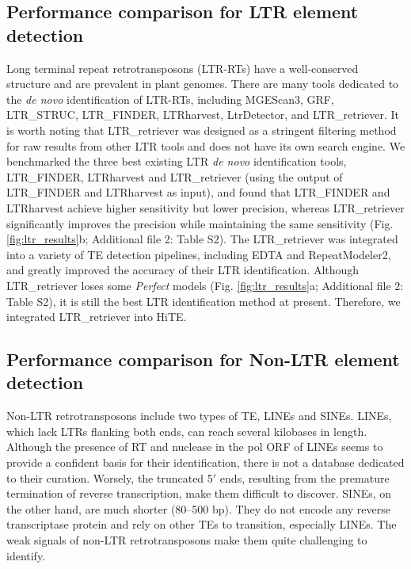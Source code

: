 \documentclass{bmcart}
\begin{document}
\subsection*{Performance comparison for LTR element detection}
Long terminal repeat retrotransposons (LTR-RTs) have a well-conserved structure and are prevalent in plant genomes. There are many tools dedicated to the \emph{de novo} identification of LTR-RTs, including MGEScan3\cite{lee2016mgescan}, GRF, LTR\_STRUC\cite{mccarthy2003ltr_struc}, LTR\_FINDER\cite{xu2007ltr_finder}, LTRharvest\cite{ellinghaus2008ltrharvest}, LtrDetector\cite{valencia2019ltrdetector}, and LTR\_retriever\cite{ou2018ltr_retriever}. It is worth noting that LTR\_retriever was designed as a stringent filtering method for raw results from other LTR tools and does not have its own search engine. We benchmarked the three best existing LTR \emph{de novo} identification tools, LTR\_FINDER, LTRharvest and LTR\_retriever (using the output of LTR\_FINDER and LTRharvest as input), and found that LTR\_FINDER and LTRharvest achieve higher sensitivity but lower precision, whereas LTR\_retriever significantly improves the precision while maintaining the same sensitivity (Fig. \ref{fig:ltr_results}b; Additional file 2: Table S2). The LTR\_retriever was integrated into a variety of TE detection pipelines, including EDTA and RepeatModeler2, and greatly improved the accuracy of their LTR identification. Although LTR\_retriever loses some \emph{Perfect} models (Fig. \ref{fig:ltr_results}a; Additional file 2: Table S2), it is still the best LTR identification method at present. Therefore, we integrated LTR\_retriever into HiTE.


\subsection*{Performance comparison for Non-LTR element detection}
Non-LTR retrotransposons include two types of TE, LINEs and SINEs\cite{zhao2016makes}. LINEs, which lack LTRs flanking both ends, can reach several kilobases in length. Although the presence of RT and nuclease in the pol ORF of LINEs seems to provide a confident basis for their identification, there is not a database dedicated to their curation. Worsely, the truncated 5$'$ ends, resulting from the premature termination of reverse transcription, make them difficult to discover. SINEs, on the other hand, are much shorter (80–500 bp)\cite{wicker2007unified}. They do not encode any reverse transcriptase protein and rely on other TEs to transition, especially LINEs\cite{dewannieux2003line}. The weak signals of non-LTR retrotransposons make them quite challenging to identify\cite{mao2017sine_scan}.
\end{document}
